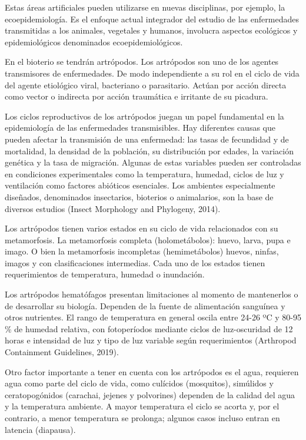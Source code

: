 \documentclass[
11pt, %
]{charter}
\begin{document}
Estas áreas artificiales pueden utilizarse en nuevas disciplinas, por ejemplo, la ecoepidemiología. Es el enfoque actual integrador del estudio de las enfermedades transmitidas a los animales, vegetales y humanos, involucra aspectos ecológicos y epidemiológicos denominados ecoepidemiológicos.

En el bioterio se tendrán artrópodos. Los artrópodos son uno de los agentes transmisores de enfermedades. De modo independiente a su rol en el ciclo de vida del agente etiológico viral, bacteriano o parasitario. Actúan por acción directa como vector o indirecta por acción traumática e irritante de su picadura. 

Los ciclos reproductivos de los artrópodos juegan un papel fundamental en la epidemiología de las enfermedades transmisibles. Hay diferentes causas que pueden afectar la transmisión de una enfermedad: las tasas de fecundidad y de mortalidad, la densidad de la población, su distribución por edades, la variación genética y la tasa de migración.  Algunas de estas variables pueden ser controladas en condiciones experimentales como la temperatura, humedad, ciclos de luz y ventilación como factores abióticos esenciales. Los ambientes especialmente diseñados, denominados insectarios, bioterios o animalarios, son la base de diversos estudios (Insect Morphology and Phylogeny, 2014).

Los artrópodos tienen varios estados en su ciclo de vida relacionados con su metamorfosis. La metamorfosis completa (holometábolos): huevo, larva, pupa e imago. O bien la metamorfosis incompletas (hemimetábolos) huevos, ninfas, imagos y con clasificaciones intermedias.  Cada uno de los estados tienen requerimientos de temperatura, humedad o inundación.  

Los artrópodos hematófagos presentan limitaciones al momento de mantenerlos o de desarrollar su biología. Dependen de la fuente de alimentación sanguínea y otros nutrientes.  El rango de temperatura en general oscila entre 24-26 ºC y 80-95 \% de humedad relativa, con fotoperíodos mediante ciclos de luz-oscuridad de 12 horas e intensidad de luz y tipo de luz variable según requerimientos (Arthropod Containment Guidelines, 2019).

Otro factor importante a tener en cuenta con los artrópodos es el agua, requieren agua como parte del ciclo de vida, como culícidos (mosquitos), simúlidos y ceratopogónidos (carachai, jejenes y polvorines) dependen de la calidad del agua y la temperatura ambiente. A mayor temperatura el ciclo se acorta y, por el contrario, a menor temperatura se prolonga; algunos casos incluso entran en latencia (diapausa).
\end{document}
